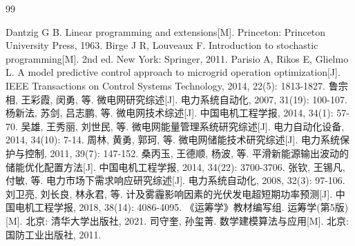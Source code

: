 
\newpage
\begin{thebibliography}{99}

 Dantzig G B. Linear programming and extensions[M]. Princeton: Princeton University Press, 1963.
 Birge J R, Louveaux F. Introduction to stochastic programming[M]. 2nd ed. New York: Springer, 2011.
 Parisio A, Rikos E, Glielmo L. A model predictive control approach to microgrid operation optimization[J]. IEEE Transactions on Control Systems Technology, 2014, 22(5): 1813-1827.
 鲁宗相, 王彩霞, 闵勇, 等. 微电网研究综述[J]. 电力系统自动化, 2007, 31(19): 100-107.
 杨新法, 苏剑, 吕志鹏, 等. 微电网技术综述[J]. 中国电机工程学报, 2014, 34(1): 57-70.
 吴雄, 王秀丽, 刘世民, 等. 微电网能量管理系统研究综述[J]. 电力自动化设备, 2014, 34(10): 7-14.
 周林, 黄勇, 郭珂, 等. 微电网储能技术研究综述[J]. 电力系统保护与控制, 2011, 39(7): 147-152.
 桑丙玉, 王德顺, 杨波, 等. 平滑新能源输出波动的储能优化配置方法[J]. 中国电机工程学报, 2014, 34(22): 3700-3706.
 张钦, 王锡凡, 付敏, 等. 电力市场下需求响应研究综述[J]. 电力系统自动化, 2008, 32(3): 97-106.
 刘卫亮, 刘长良, 林永君, 等. 计及雾霾影响因素的光伏发电超短期功率预测[J]. 中国电机工程学报, 2018, 38(14): 4086-4095.
 《运筹学》教材编写组. 运筹学(第5版)[M]. 北京: 清华大学出版社, 2021.
 司守奎, 孙玺菁. 数学建模算法与应用[M]. 北京: 国防工业出版社, 2011.

\end{thebibliography}
